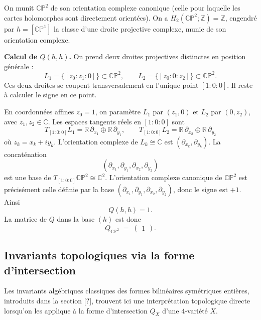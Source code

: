 \begin{exemple}[$\mathbb{CP}^2$]
On munit $\mathbb{CP}^2$ de son orientation complexe canonique (celle pour
laquelle les cartes holomorphes sont directement orientées). On a
$H_2(\mathbb{CP}^2;\mathbb{Z}) = \mathbb{Z}$, engendré par $h = [\mathbb{CP}^1]$
la classe d'une droite projective complexe, munie de son orientation complexe.

\medskip
\noindent\textbf{Calcul de $Q(h,h)$.}
On prend deux droites projectives distinctes en position générale :
\[
  L_1 = \{[z_0 : z_1 : 0]\} \subset \mathbb{CP}^2, \qquad
  L_2 = \{[z_0 : 0 : z_2]\} \subset \mathbb{CP}^2.
\]
Ces deux droites se coupent transversalement en l'unique point $[1:0:0]$. Il
reste à calculer le signe en ce point.

En coordonnées affines $z_0 = 1$, on paramètre $L_1$ par $(z_1, 0)$ et $L_2$
par $(0, z_2)$, avec $z_1, z_2 \in \mathbb{C}$. Les espaces tangents réels en
$[1:0:0]$ sont
\[
  T_{[1:0:0]} L_1 = \mathbb{R}\,\partial_{x_1} \oplus \mathbb{R}\,\partial_{y_1},
  \qquad
  T_{[1:0:0]} L_2 = \mathbb{R}\,\partial_{x_2} \oplus \mathbb{R}\,\partial_{y_2}
\]
où $z_k = x_k + iy_k$. L'orientation complexe de $L_k \cong \mathbb{C}$ est
$(\partial_{x_k}, \partial_{y_k})$. La concaténation
\[
  (\partial_{x_1}, \partial_{y_1}, \partial_{x_2}, \partial_{y_2})
\]
est une base de $T_{[1:0:0]}\mathbb{CP}^2 \cong \mathbb{C}^2$. L'orientation
complexe canonique de $\mathbb{CP}^2$ est précisément celle définie par la base
$(\partial_{x_1}, \partial_{y_1}, \partial_{x_2}, \partial_{y_2})$, donc le
signe est $+1$. Ainsi
\[
  Q(h,h) = 1.
\]
La matrice de $Q$ dans la base $(h)$ est donc
\[
  Q_{\mathbb{CP}^2} \;=\; \begin{pmatrix} 1 \end{pmatrix}.
\]
\end{exemple}

\subsection{Invariants topologiques via la forme d'intersection}

Les invariants algébriques classiques des formes bilinéaires symétriques entières, introduits dans la section [?], trouvent ici une interprétation topologique directe lorsqu'on les applique à la forme d'intersection $Q_X$ d'une $4$-variété $X$. 

